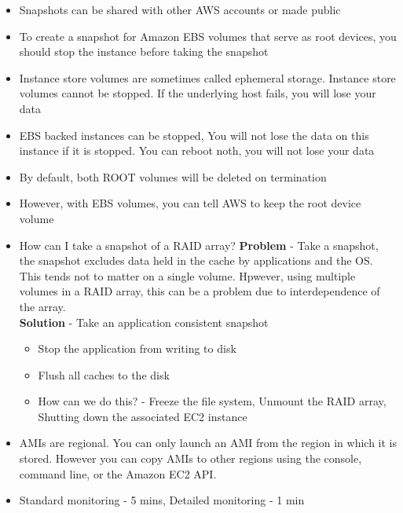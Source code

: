 \documentclass{article}
\begin{document}
\begin{itemize}
\item
Snapshots can be shared with other AWS accounts or made public

\item
To create a snapshot for Amazon EBS volumes that serve as root devices, you should stop the instance before taking the snapshot

\item
Instance store volumes are sometimes called ephemeral storage. Instance store volumes cannot be stopped. If the underlying host fails, you will lose your data

\item
EBS backed instances can be stopped, You will not lose the data on this instance if it is stopped. You can reboot noth, you will not lose your data

\item
By default, both ROOT volumes will be deleted on termination

\item
However, with EBS volumes, you can tell AWS to keep the root device volume

\item
How can I take a snapshot of a RAID array?
\textbf{Problem} - Take a snapshot, the snapshot excludes data held in the cache by applications and the OS. This tends not to matter on a single volume. Hpwever, using multiple volumes in a RAID array, this can be a problem due to interdependence of the array. \\
\textbf{Solution} - Take an application consistent snapshot
	\begin{itemize}
	\item
	Stop the application from writing to disk
	
	\item
	Flush all caches to the disk
	
	\item
	How can we do this? - Freeze the file system, Unmount the RAID array, Shutting down the associated EC2 instance
	
	\end{itemize}
	
\item
AMIs are regional. You can only launch an AMI from the region in which it is stored. However you can copy AMIs to other regions using the console, command line, or the Amazon EC2 API.
	
\item
Standard monitoring - 5 mins, Detailed monitoring - 1 min


\end{itemize}
\end{document}
